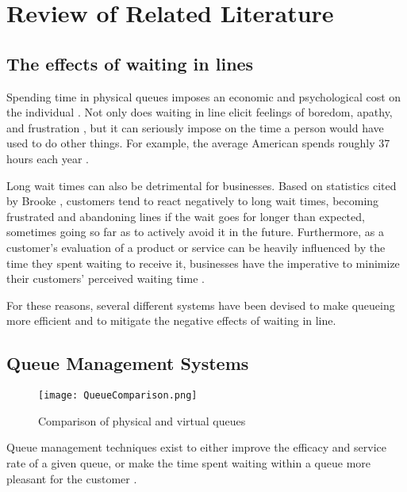 \chapter{Review of Related Literature}
\label{sec:relatedlit}

\section{The effects of waiting in lines}

Spending time in physical queues imposes an economic and psychological cost on the individual \cite{chebat1993impact}. Not only does waiting in line elicit feelings of boredom, apathy, and frustration \cite{waitwhile2022survey}, but it can seriously impose on the time a person would have used to do other things. For example, the average American spends roughly 37 hours each year \cite{stone2012waiting}.

Long wait times can also be detrimental for businesses. Based on statistics cited by Brooke \citeyear{brooke2013ditch}, customers tend to react negatively to long wait times, becoming frustrated and abandoning lines if the wait goes for longer than expected, sometimes going so far as to actively avoid it in the future. Furthermore, as a customer’s evaluation of a product or service can be heavily influenced by the time they spent waiting to receive it, businesses have the imperative to minimize their customers’ perceived waiting time \cite{chebat1993impact}.

For these reasons, several different systems have been devised to make queueing more efficient and to mitigate the negative effects of waiting in line.

\section{Queue Management Systems}

\begin{figure}[h] %
\centering
\caption{Comparison of physical and virtual queues}
\texttt{[image: QueueComparison.png]}
\label{fig:queuecomparison}
\end{figure}


Queue management techniques exist to either improve the efficacy and service rate of a given queue, or make the time spent waiting within a queue more pleasant for the customer \cite{norman2008psychology}.

